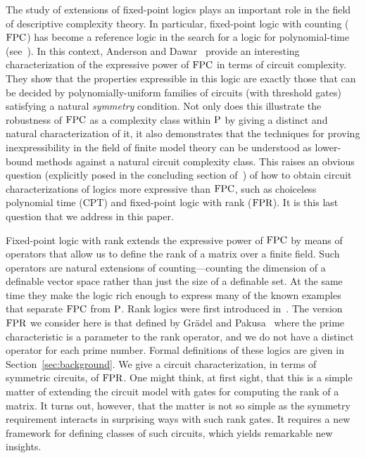 \documentclass[../paper.tex]{subfiles}
\begin{document}
The study of extensions of fixed-point logics plays an important role
in the field of descriptive complexity theory.  In particular,
fixed-point logic with counting ($\text{\upshape FPC}$) has become a reference logic
in the search for a logic for polynomial-time
(see~\cite{Dawar-siglog}).  In this context, Anderson and
Dawar~\cite{AndersonD17} provide an interesting characterization of
the expressive power of $\text{\upshape FPC}$ in terms of circuit complexity.  They
show that the properties expressible in this logic are exactly those
that can be decided by polynomially-uniform families of circuits (with
threshold gates) satisfying a natural \emph{symmetry} condition.  Not
only does this illustrate the robustness of $\text{\upshape FPC}$ as a complexity
class within $\mathrm{P}$ by giving a distinct and natural characterization
of it, it also demonstrates that the techniques for proving
inexpressibility in the field of finite model theory can be understood
as lower-bound methods against a natural circuit complexity class.
This raises an obvious question (explicitly posed in the concluding
section of~\cite{AndersonD17}) of how to obtain circuit
characterizations of logics more expressive than $\text{\upshape FPC}$, such as
choiceless polynomial time (CPT) and fixed-point logic with rank
($\text{\upshape FPR}$).  It is this last question that we address in this paper.

Fixed-point logic with rank extends the expressive power of $\text{\upshape FPC}$ by
means of operators that allow us to define the rank of a matrix over a
finite field.  Such operators are natural extensions of
counting---counting the dimension of a definable vector space
rather than just the size of a definable set.  At the same time they
make the logic rich enough to express many of the known examples that
separate $\text{\upshape FPC}$ from $\mathrm{P}$.  Rank logics were first introduced
in~\cite{Dawar09logicswith}.  The version $\text{\upshape FPR}$ we consider here is that
defined by Gr\"adel and Pakusa~\cite{GradelP15a} where the prime
characteristic is a parameter to the rank operator, and we do not have
a distinct operator for each prime number.  Formal definitions of
these logics are given in Section~\ref{sec:background}.  We give a circuit
characterization, in terms of symmetric circuits, of $\text{\upshape FPR}$.  One
might think, at first sight, that this is a simple matter of extending
the circuit model with gates for computing the rank of a matrix.
It turns out, however, that the matter is not so simple as the
symmetry requirement interacts in surprising ways with such rank
gates.  It requires a new framework for defining classes of such
circuits, which yields remarkable new insights. 
\end{document}
